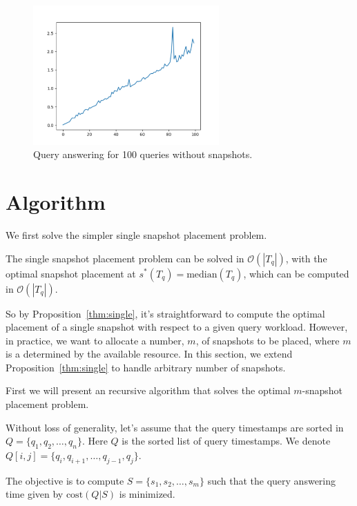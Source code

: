 \begin{figure}[tb]
    \label{fig:query-time-no-snap}
    \centering
    \includegraphics[width=2.8in]{figs/runtime.pdf}
    \caption{Query answering for 100 queries without snapshots.}
\end{figure}




\section{Algorithm}

We first solve the simpler single snapshot placement problem.

\begin{prop}
    \label{thm:single}
    The single snapshot placement problem can be solved in $\mathcal{O}(|T_q|)$,
    with the optimal snapshot placement at
    $ s^*(T_q) = \mathrm{median}(T_q) $,
    which can be computed in $\mathcal{O}(|T_q|)$.
\end{prop}


So by Proposition~\ref{thm:single}, it's straightforward to compute the optimal
placement of a single snapshot with respect to a given query workload.  However,
in practice, we want to allocate a number, $m$, of snapshots to be placed, where
$m$ is a determined by the available resource.
In this section, we extend Proposition~\ref{thm:single} to handle arbitrary number
of snapshots.

First we will present an recursive algorithm that solves the optimal
$m$-snapshot placement problem.

Without loss of generality, let's assume that  the query timestamps are sorted
in $Q = \{q_1, q_2, \dots, q_n\}$.  Here $Q$ is the sorted list of query
timestamps.  We denote $Q[i,j] = \{q_i, q_{i+1}, \dots, q_{j-1}, q_j\}$.

The objective is to compute $S = \{s_1, s_2, \dots, s_m\}$ such
that the query answering time given by $\mathrm{cost}(Q|S)$ is minimized.

